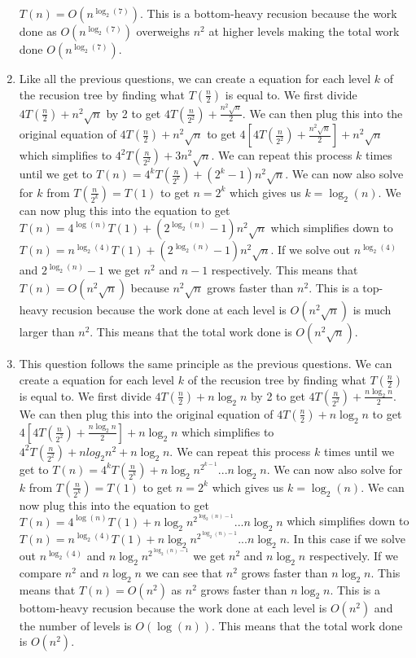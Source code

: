 \documentclass[12pt,letterpaper]{article}
\begin{document}
\begin{enumerate}
    $T(n) = O(n^{\log_2(7)})$. This is a bottom-heavy recusion because the work done as $O(n^{\log_2(7)})$ overweighs
    $n^2$ at higher levels making the total work done $O(n^{\log_2(7)})$.
    \item Like all the previous questions, we can create a equation for each level $k$ of the recusion tree by finding what $T(\frac{n}{2})$ is equal to.
    We first divide $4T(\frac{n}{2})+n^2\sqrt{n}$ by 2 to get $4T(\frac{n}{2^2}) + \frac{n^2\sqrt{n}}{2}$. 
    We can then plug this into the original equation of $4T(\frac{n}{2})+n^2\sqrt{n}$ to get $4[4T(\frac{n}{2^2}) + \frac{n^2\sqrt{n}}{2}] + n^2\sqrt{n}$ which
    simplifies to $4^2T(\frac{n}{2^2}) + 3n^2\sqrt{n}$. We can repeat this process $k$ times until we get to $T(n) = 4^kT(\frac{n}{2^k}) + (2^k-1)n^2\sqrt{n}$.
    We can now also solve for $k$ from $T(\frac{n}{2^k}) = T(1)$ to get $n = 2^k$ which gives us $k = \log_2(n)$. We can now plug this into the equation to get $T(n) = 4^{\log(n)}T(1) + (2^{\log_2(n)}-1)n^2\sqrt{n}$ which
    simplifies down to $T(n) = n^{\log_2(4)}T(1) + (2^{\log_2(n)}-1)n^2\sqrt{n}$. If we solve out $n^{\log_2(4)}$ and $2^{\log_2(n)}-1$ we get $n^2$ and $n-1$ respectively.
    This means that $T(n) = O(n^2\sqrt{n})$ because $n^2\sqrt{n}$ grows faster than $n^2$. This is a top-heavy recusion because the work done at each level is $O(n^2\sqrt{n})$ 
    is much larger than $n^2$. This means that the total work done is $O(n^2\sqrt{n})$.
    \item This question follows the same principle as the previous questions. We can create a equation for each level $k$ of the recusion tree by finding what $T(\frac{n}{2})$ is equal to.
    We first divide $4T(\frac{n}{2})+n\log_2n$ by 2 to get $4T(\frac{n}{2^2}) + \frac{n\log_2n}{2}$. We can then plug this into the original equation of $4T(\frac{n}{2})+n\log_2n$ to get $4[4T(\frac{n}{2^2}) + \frac{n\log_2n}{2}] + n\log_2n$ which
    simplifies to $4^2T(\frac{n}{2^2}) + nlog_2n^2 + n\log_2n$. We can repeat this process $k$ times until we get to $T(n) = 4^kT(\frac{n}{2^k}) + n\log_2n^{2^{k-1}} ... n\log_2n$. 
    We can now also solve for $k$ from $T(\frac{n}{2^k}) = T(1)$ to get $n = 2^k$ which gives us $k = \log_2(n)$. 
    We can now plug this into the equation to get $T(n) = 4^{\log(n)}T(1) + n\log_2n^{2^{\log_2(n)-1}} ... n\log_2n$ which
    simplifies down to $T(n) = n^{\log_2(4)}T(1) + n\log_2n^{2^{\log_2(n)-1}} ... n\log_2n$. 
    In this case if we solve out $n^{\log_2(4)}$ and $n\log_2n^{2^{\log_2(n)-1}}$ we get $n^2$ and $n\log_2n$ respectively.
    If we compare $n^2$ and $n\log_2n$ we can see that $n^2$ grows faster than $n\log_2n$.
    This means that $T(n) = O(n^2)$ as $n^2$ grows faster than $n\log_2n$. This is a bottom-heavy recusion because the work done at each level is $O(n^2)$ and the number of levels is $O(\log(n))$. This means that the total work done is $O(n^2)$.
    
\end{enumerate}
\end{document}
